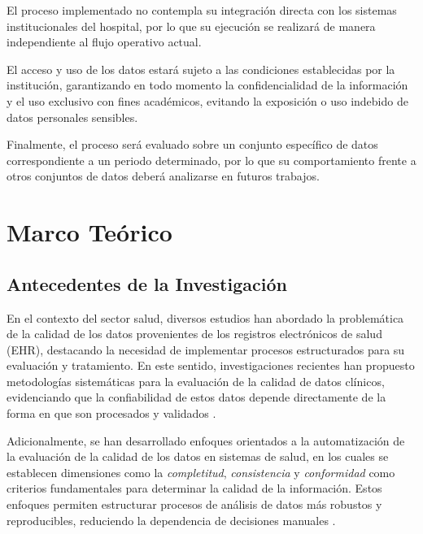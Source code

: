\documentclass[12pt, letterpaper, oneside]{article}
\begin{document}
El proceso implementado no contempla su integración directa con los sistemas institucionales del hospital, por lo que su ejecución se realizará de manera independiente al flujo operativo actual.

El acceso y uso de los datos estará sujeto a las condiciones establecidas por la institución, garantizando en todo momento la confidencialidad de la información y el uso exclusivo con fines académicos, evitando la exposición o uso indebido de datos personales sensibles.

Finalmente, el proceso será evaluado sobre un conjunto específico de datos correspondiente a un periodo determinado, por lo que su comportamiento frente a otros conjuntos de datos deberá analizarse en futuros trabajos.

\newpage


\section{Marco Teórico}

\subsection{Antecedentes de la Investigación}

En el contexto del sector salud, diversos estudios han abordado la problemática de la calidad de los datos provenientes de los registros electrónicos de salud (EHR), destacando la necesidad de implementar procesos estructurados para su evaluación y tratamiento. En este sentido, investigaciones recientes han propuesto metodologías sistemáticas para la evaluación de la calidad de datos clínicos, evidenciando que la confiabilidad de estos datos depende directamente de la forma en que son procesados y validados \parencite{razzaghi_systematic_2024}.

Adicionalmente, se han desarrollado enfoques orientados a la automatización de la evaluación de la calidad de los datos en sistemas de salud, en los cuales se establecen dimensiones como la \textit{completitud}, \textit{consistencia} y \textit{conformidad} como criterios fundamentales para determinar la calidad de la información. Estos enfoques permiten estructurar procesos de análisis de datos más robustos y reproducibles, reduciendo la dependencia de decisiones manuales \parencite{ozonze_automating_2023}.
\end{document}
